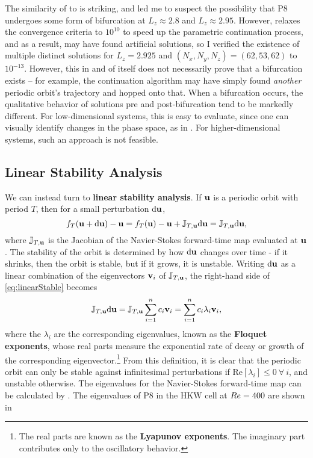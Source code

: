  The similarity of  to  is striking, and led me to suspect the possibility that P8 undergoes some form of bifurcation at $L_z \approx 2.8$ and $L_z \approx 2.95$. However,  relaxes the convergence criteria to $10^{10}$ to speed up the parametric continuation process, and as a result, may have found artificial solutions, so I verified the existence of multiple distinct solutions for $L_z = 2.925$ and $(N_x,N_y,N_z) = (62,53,62)$ to $10^{-13}$. However, this in and of itself does not necessarily prove that a bifurcation exists -- for example, the continuation algorithm may have simply found \emph{another} periodic orbit's trajectory and hopped onto that. When a bifurcation occurs, the qualitative behavior of solutions pre and post-bifurcation tend to be markedly different. For low-dimensional systems, this is easy to evaluate, since one can visually identify changes in the phase space, as in . For higher-dimensional systems, such an approach is not feasible. 

\subsection{Linear Stability Analysis}\label{sec:LSA}

We can instead turn to {\bf linear stability analysis}. If $\mathbf{u}$ is a periodic orbit with period $T$, then for a small perturbation ${\bf \textrm{d}}\mathbf{u}$, 
\begin{equation}\label{eq:linearStable}
 f_T(\mathbf{u} + {\bf \textrm{d}}\mathbf{u}) - \mathbf{u} =  f_T(\mathbf{u}) - \mathbf{u} + \mathbb{J}_{T,\mathbf{u}}{\bf \textrm{d}}\mathbf{u} =  \mathbb{J}_{T,\mathbf{u}}{\bf \textrm{d}}\mathbf{u},
\end{equation} 
where $ \mathbb{J}_{T,\mathbf{u}}$ is the Jacobian of the Navier-Stokes forward-time map evaluated at $\mathbf{u}$. The stability of the orbit is determined by how  ${\bf \textrm{d}}\mathbf{u}$ changes over time - if it shrinks, then the orbit is stable, but if it grows, it is unstable. Writing  ${\bf \textrm{d}}\mathbf{u}$ as a linear combination of the eigenvectors $\mathbf{v}_i$ of  $ \mathbb{J}_{T,\mathbf{u}}$, the right-hand side of \eqref{eq:linearStable} becomes
\begin{equation}\label{eq:oneOrbit}
 \mathbb{J}_{T,\Vector{u}}{\bf \textrm{d}}\Vector{u} =  \mathbb{J}_{T,\Vector{u}}\sum{i = 1}{n}{c_i\Vector{v}_i} = \sum{i = 1}{n}{c_i\lambda_i\Vector{v}_i},
\end{equation}  
where the $\lambda_i$ are the corresponding eigenvalues, known as the {\bf Floquet exponents}, whose real parts measure the exponential rate of decay or growth of the corresponding eigenvector.\footnote{The real parts are known as the {\bf Lyapunov exponents}. The imaginary part contributes only to the oscillatory behavior.}   From this definition, it is clear that the periodic orbit can only be stable against infinitesimal perturbations if $\textrm{Re}[\lambda_i]  \leq 0~\forall~i$, and unstable otherwise. The eigenvalues for the Navier-Stokes forward-time map can be calculated by . The eigenvalues of P8 in the HKW cell at $Re=400$ are shown in 

